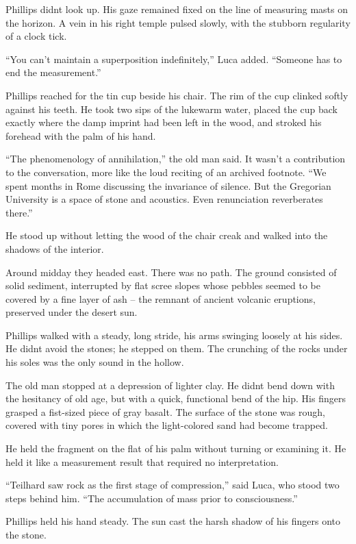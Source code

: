 \documentclass[
  ngerman,
]{article}
\begin{document}
Phillips didn\textquotesingle t look up. His gaze remained fixed on the
line of measuring masts on the horizon. A vein in his right temple
pulsed slowly, with the stubborn regularity of a clock tick.

``You can't maintain a superposition indefinitely,'' Luca added.
``Someone has to end the measurement.''

Phillips reached for the tin cup beside his chair. The rim of the cup
clinked softly against his teeth. He took two sips of the lukewarm
water, placed the cup back exactly where the damp imprint had been left
in the wood, and stroked his forehead with the palm of his hand.

``The phenomenology of annihilation,'' the old man said. It wasn't a
contribution to the conversation, more like the loud reciting of an
archived footnote. ``We spent months in Rome discussing the invariance
of silence. But the Gregorian University is a space of stone and
acoustics. Even renunciation reverberates there.''

He stood up without letting the wood of the chair creak and walked into
the shadows of the interior.

Around midday they headed east. There was no path. The ground consisted
of solid sediment, interrupted by flat scree slopes whose pebbles seemed
to be covered by a fine layer of ash -- the remnant of ancient volcanic
eruptions, preserved under the desert sun.

Phillips walked with a steady, long stride, his arms swinging loosely at
his sides. He didn\textquotesingle t avoid the stones; he stepped on
them. The crunching of the rocks under his soles was the only sound in
the hollow.

The old man stopped at a depression of lighter clay. He
didn\textquotesingle t bend down with the hesitancy of old age, but with
a quick, functional bend of the hip. His fingers grasped a fist-sized
piece of gray basalt. The surface of the stone was rough, covered with
tiny pores in which the light-colored sand had become trapped.

He held the fragment on the flat of his palm without turning or
examining it. He held it like a measurement result that required no
interpretation.

``Teilhard saw rock as the first stage of compression,'' said Luca, who
stood two steps behind him. ``The accumulation of mass prior to
consciousness.''

Phillips held his hand steady. The sun cast the harsh shadow of his
fingers onto the stone.
\end{document}
